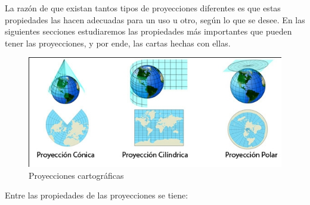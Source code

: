 \documentclass[a4paper,12pt,twoside]{article}
\begin{document}
La razón de que existan tantos tipos de proyecciones diferentes es que estas propiedades las hacen adecuadas para un uso u otro, según lo que se desee. En las siguientes secciones estudiaremos las propiedades más importantes que pueden tener las proyecciones, y por ende, las cartas hechas con ellas. 

\begin{figure}[!h]
  \centering
  \includegraphics[width=\textwidth]{./Imagenes/proyecciones.jpg}
  \caption{Proyecciones cartogr\'aficas}
  \label{fig:proyecciones.cartograficas}
\end{figure}

Entre las propiedades de las proyecciones se tiene:
\end{document}
